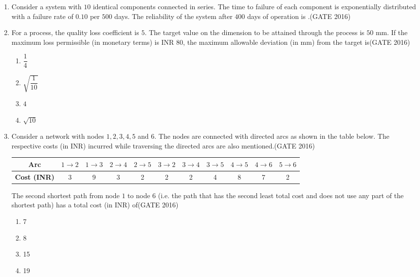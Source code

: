 \documentclass[journal,12pt,onecolumn]{IEEEtran}
\theoremstyle{remark}
\begin{document}
\begin{enumerate}
\item Consider a system with $10$ identical components connected in series. The time to failure of each component is exponentially distributed with a failure rate of $0.10$ per $500$ days. The reliability of the system after $400$ days of operation is \underline{\hspace{2cm}}.\hfill{(GATE 2016)}
\vspace{0.5cm}

\item For a process, the quality loss coefficient is $5$. The target value on the dimension to be attained through the process is $50$ mm. If the maximum loss permissible (in monetary terms) is INR $80$, the maximum allowable deviation (in mm) from the target is\hfill{(GATE 2016)}
\begin{multicols}{4}
\begin{enumerate}
    \item $\dfrac{1}{4}$
    \item $\sqrt{\dfrac{1}{10}}$
    \item $4$
    \item $\sqrt{10}$
\end{enumerate}
\end{multicols}
\vspace{0.5cm}
\item Consider a network with nodes $1, 2, 3, 4, 5$ and $6$. The nodes are connected with directed arcs as shown in the table below. The respective costs (in INR) incurred while traversing the directed arcs are also mentioned.\hfill{(GATE 2016)}

\begin{center}
\begin{tabular}{|c|c|c|c|c|c|c|c|c|c|c|}
\hline
\textbf{Arc} & $1 \rightarrow 2$ & $1 \rightarrow 3$ & $2 \rightarrow 4$ & $2 \rightarrow 5$ & $3 \rightarrow 2$ & $3 \rightarrow 4$ & $3 \rightarrow 5$ & $4 \rightarrow 5$ & $4 \rightarrow 6$ & $5 \rightarrow 6$ \\
\hline
\textbf{Cost (INR)} & 3 & 9 & 3 & 2 & 2 & 2 & 4 & 8 & 7 & 2 \\
\hline
\end{tabular}
\end{center}

The second shortest path from node $1$ to node $6$ (i.e. the path that has the second least total cost and does not use any part of the shortest path) has a total cost (in INR) of\hfill{(GATE 2016)}
\begin{multicols}{4}
\begin{enumerate}
    \item 7
    \item 8
    \item 15
    \item 19
\end{enumerate}
\end{multicols}


\end{enumerate}
\end{document}
